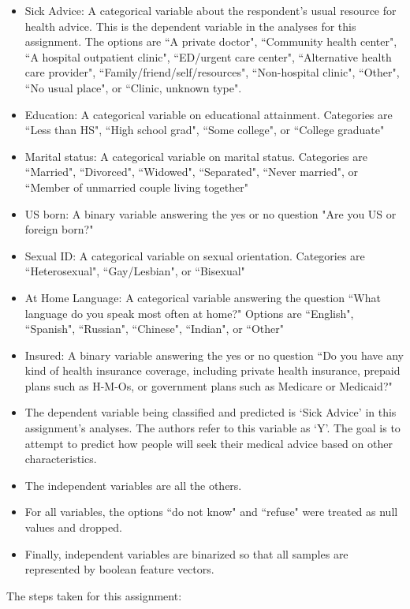 \documentclass[10pt,twocolumn]{article}
\begin{document}
\begin{itemize}
\item Sick Advice: A categorical variable about the respondent's usual resource for
health advice. This is the dependent variable in the analyses for this
assignment. The options are
``A private doctor",
``Community health center",
``A hospital outpatient clinic",
``ED/urgent care center",
``Alternative health care provider",
``Family/friend/self/resources",
``Non-hospital clinic",
``Other",
``No usual place", or
``Clinic, unknown type".
\item Education: A categorical variable on educational attainment. Categories are ``Less than HS", ``High school grad",
``Some college", or ``College graduate"
\item Marital status: A categorical variable on marital status. Categories are
``Married",
``Divorced",
``Widowed",
``Separated",
``Never married", or
``Member of unmarried couple living together"
\item US born: A binary variable answering the yes or no question "Are you US or foreign born?"
\item Sexual ID: A categorical variable on sexual orientation. Categories are
``Heterosexual",
``Gay/Lesbian", or
``Bisexual"
\item At Home Language: A categorical variable answering the question ``What language do you
speak most often at
home?" Options are
``English",
``Spanish",
``Russian",
``Chinese",
``Indian", or
``Other"
\item Insured: A binary variable answering the yes or no question ``Do you have any
kind of health
insurance coverage,
including private
health insurance,
prepaid plans such as
H-M-Os, or
government plans
such as Medicare or
Medicaid?"
\item The dependent variable being classified and predicted is `Sick Advice' in this assignment's
analyses. The authors refer to this variable as `Y'. The goal is to attempt to
predict how people will seek their medical advice based on other characteristics.
\item The independent variables are all the others.
\item  For all variables, the options ``do not know" and ``refuse"
were treated as null values and dropped.
\item Finally, independent variables are binarized so that all samples are represented
by boolean feature vectors.
\end{itemize}


The steps taken for this assignment:
\end{document}
